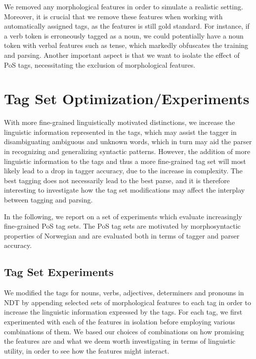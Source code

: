 \documentclass[11pt,a4paper]{article}
\begin{document}
We removed any morphological features in order to simulate a realistic setting.
Moreover, it is crucial that we remove these features when working with
automatically assigned tags, as the features is still gold standard.  For
instance, if a verb token is erroneously tagged as a noun, we could potentially
have a noun token with verbal features such as tense, which markedly obfuscates
the training and parsing. Another important aspect is that we want to isolate
the effect of PoS tags, necessitating the exclusion of morphological features.


\section{Tag Set Optimization/Experiments}
\label{sec:optimization}
With more fine-grained linguistically
motivated distinctions, we increase the linguistic information represented in
the tags, which may assist the tagger in disambiguating ambiguous and unknown
words, which in turn may aid the parser in recognizing and generalizing
syntactic patterns. However, the addition of more linguistic information to the
tags and thus a more fine-grained tag set will most likely lead to a drop in
tagger accuracy, due to the increase in complexity. The best tagging does not
necessarily lead to the best parse, and it is therefore interesting to
investigate how the tag set modifications may affect the interplay between
tagging and parsing.

In the following, we report on a set of experiments which evaluate
increasingly fine-grained PoS tag sets. The PoS tag sets are motivated
by morphosyntactic properties of Norwegian and are evaluated both in
terms of tagger and parser accuracy.

\subsection{Tag Set Experiments}
We modified the tags for nouns, verbs, adjectives, determiners and pronouns in
NDT by appending selected sets of morphological features to each tag in order
to increase the linguistic information expressed by the tags.  For each tag, we
first experimented with each of the features in isolation before employing
various combinations of them. We based our choices of combinations on how
promising the features are and what we deem worth investigating in terms of
linguistic utility, in order to see how the features might interact.
\end{document}
